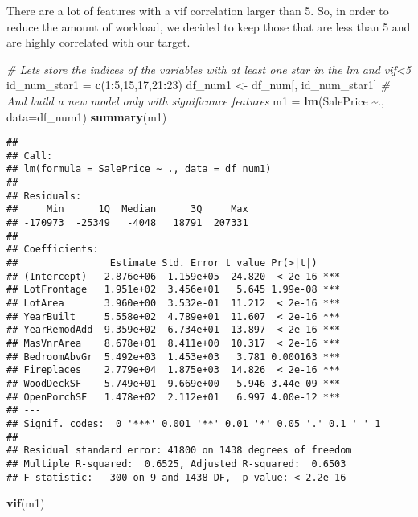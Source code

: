 \documentclass[
]{article}
\newenvironment{Shaded}{\begin{snugshade}}{\end{snugshade}}
\newcommand{\AttributeTok}[1]{\textcolor[rgb]{0.13,0.29,0.53}{#1}}
\newcommand{\CommentTok}[1]{\textcolor[rgb]{0.56,0.35,0.01}{\textit{#1}}}
\newcommand{\DecValTok}[1]{\textcolor[rgb]{0.00,0.00,0.81}{#1}}
\newcommand{\FunctionTok}[1]{\textcolor[rgb]{0.13,0.29,0.53}{\textbf{#1}}}
\newcommand{\NormalTok}[1]{#1}
\newcommand{\OtherTok}[1]{\textcolor[rgb]{0.56,0.35,0.01}{#1}}
\newcommand{\SpecialCharTok}[1]{\textcolor[rgb]{0.81,0.36,0.00}{\textbf{#1}}}
\begin{document}
There are a lot of features with a vif correlation larger than 5. So, in
order to reduce the amount of workload, we decided to keep those that
are less than 5 and are highly correlated with our target.

\begin{Shaded}
\begin{Highlighting}[]
\CommentTok{\# Let\textquotesingle{}s store the indices of the variables with at least one star in the lm and vif\textless{}5}
\NormalTok{id\_num\_star1 }\OtherTok{=} \FunctionTok{c}\NormalTok{(}\DecValTok{1}\SpecialCharTok{:}\DecValTok{5}\NormalTok{,}\DecValTok{15}\NormalTok{,}\DecValTok{17}\NormalTok{,}\DecValTok{21}\SpecialCharTok{:}\DecValTok{23}\NormalTok{)}
\NormalTok{df\_num1 }\OtherTok{\textless{}{-}}\NormalTok{ df\_num[, id\_num\_star1]}
\CommentTok{\# And build a new model only with significance features}
\NormalTok{m1 }\OtherTok{=} \FunctionTok{lm}\NormalTok{(SalePrice }\SpecialCharTok{\textasciitilde{}}\NormalTok{., }\AttributeTok{data=}\NormalTok{df\_num1)}
\FunctionTok{summary}\NormalTok{(m1)}
\end{Highlighting}
\end{Shaded}

\begin{verbatim}
## 
## Call:
## lm(formula = SalePrice ~ ., data = df_num1)
## 
## Residuals:
##     Min      1Q  Median      3Q     Max 
## -170973  -25349   -4048   18791  207331 
## 
## Coefficients:
##                Estimate Std. Error t value Pr(>|t|)    
## (Intercept)  -2.876e+06  1.159e+05 -24.820  < 2e-16 ***
## LotFrontage   1.951e+02  3.456e+01   5.645 1.99e-08 ***
## LotArea       3.960e+00  3.532e-01  11.212  < 2e-16 ***
## YearBuilt     5.558e+02  4.789e+01  11.607  < 2e-16 ***
## YearRemodAdd  9.359e+02  6.734e+01  13.897  < 2e-16 ***
## MasVnrArea    8.678e+01  8.411e+00  10.317  < 2e-16 ***
## BedroomAbvGr  5.492e+03  1.453e+03   3.781 0.000163 ***
## Fireplaces    2.779e+04  1.875e+03  14.826  < 2e-16 ***
## WoodDeckSF    5.749e+01  9.669e+00   5.946 3.44e-09 ***
## OpenPorchSF   1.478e+02  2.112e+01   6.997 4.00e-12 ***
## ---
## Signif. codes:  0 '***' 0.001 '**' 0.01 '*' 0.05 '.' 0.1 ' ' 1
## 
## Residual standard error: 41800 on 1438 degrees of freedom
## Multiple R-squared:  0.6525, Adjusted R-squared:  0.6503 
## F-statistic:   300 on 9 and 1438 DF,  p-value: < 2.2e-16
\end{verbatim}

\begin{Shaded}
\begin{Highlighting}[]
\FunctionTok{vif}\NormalTok{(m1)}
\end{Highlighting}
\end{Shaded}
\end{document}
